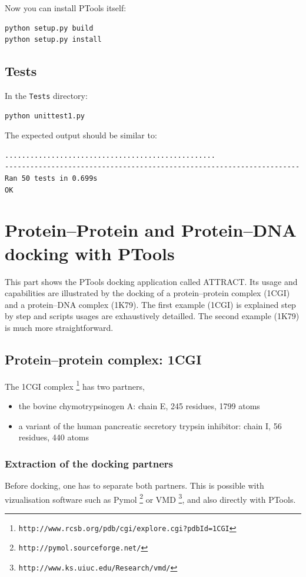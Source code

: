 \documentclass[12pt,a4paper]{article}
\begin{document}
Now you can install PTools itself:
\begin{verbatim}
python setup.py build
python setup.py install
\end{verbatim}

\subsection{Tests}

In the {\tt Tests} directory:
\begin{verbatim}
python unittest1.py
\end{verbatim}

The expected output should be similar to:
\begin{verbatim}
..................................................
----------------------------------------------------------------------
Ran 50 tests in 0.699s
OK
\end{verbatim}

\section{Protein--Protein and Protein--DNA docking with PTools}

This part shows the PTools docking application called ATTRACT\cite{Zacharias2005}. Its usage and capabilities are illustrated by the docking of a protein--protein complex (1CGI) and a protein--DNA complex\cite{Poulain2008} (1K79). The first example (1CGI) is explained 
step by step and scripts usages are exhaustively detailled. The second example (1K79) is much more straightforward.

\subsection{Protein--protein complex: 1CGI}
The 1CGI complex \footnote{\tt http://www.rcsb.org/pdb/cgi/explore.cgi?pdbId=1CGI} 
has two partners,
\begin{itemize}
\item the bovine chymotrypsinogen A: chain E, 245 residues, 1799 atoms
\item a variant of the human pancreatic secretory trypsin inhibitor: chain I, 56 residues, 440 atoms
\end{itemize}

\subsubsection{Extraction of the docking partners}
Before docking, one has to separate both partners. This is possible with vizualisation
software such as Pymol \footnote{\tt http://pymol.sourceforge.net/} or VMD \footnote{\tt http://www.ks.uiuc.edu/Research/vmd/}, 
and also directly with PTools.
\end{document}
